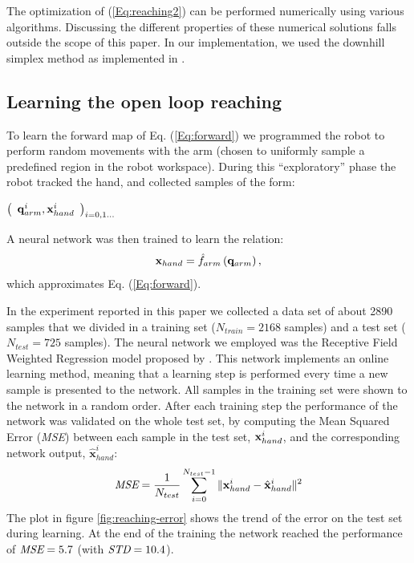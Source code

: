The optimization of (\ref{Eq:reaching2}) can be performed numerically using various algorithms. 
Discussing the different properties of these numerical 
solutions falls outside the scope of this paper. In our implementation, we used 
the downhill simplex method \cite{ne:Computer:65} as implemented in 
\cite{mo:Press:90}.

\subsection{Learning the open loop reaching}
\label{sec:learning-open-loop}
%
To learn the forward map of Eq. (\ref{Eq:forward}) we programmed 
the robot to perform random movements with the arm (chosen to uniformly sample 
a predefined region in the robot workspace). During this ``exploratory'' 
phase the robot tracked the hand, and collected samples of the form:
%
\begin{center}
\begin{math}
  \left(\begin{array}{cc}
    \mathbf q_{arm}^i , \mathbf{x}_{hand}^i\end{array}\right)_{i = 0,1\dots}
\end{math}
\end{center}
%
A neural network was then trained to learn the relation:
%
\begin{equation} 
  \mathbf{x}_{hand}=\hat{f}_{arm}\left(\mathbf q_{arm} \right),
\end{equation}
%
which approximates Eq. (\ref{Eq:forward}).

In the experiment reported in this paper we collected a data set of 
about 2890 samples that we divided in a training set ($N_{train}=2168$
 samples) and 
a test set ($N_{test}=725$ samples). The neural network we employed was the 
Receptive Field Weighted Regression model proposed 
by \cite{schaal98Constructive}. This network implements an online learning
method, meaning that a learning step is performed every time a new 
sample is presented to the network. All samples in the training set were shown
to the network in a random order. After each training step the 
performance of the network was validated on the whole test set, by computing
the Mean Squared Error (\emph{MSE}) between each sample in the test set, 
$\mathbf{x}_{hand}^i$, and the corresponding network output, 
$\mathbf{\hat{x}}_{hand}^i$:
%
\begin{equation}
\emph{MSE}=\frac{1}{N_{test}}\sum_{i=0}^{N_{test}-1}\|\mathbf{x}_{hand}^i- \hat{\mathbf{x}}_{hand}^i\|^2
\end{equation}
%
The plot in figure \ref{fig:reaching-error}
shows the trend of the error on the test set during learning. At the end of
the training the network reached the performance of $\emph{MSE}=5.7$ 
(with $\emph{STD}=10.4$).

